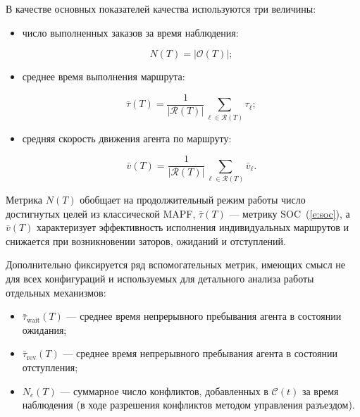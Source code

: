 В качестве основных показателей качества используются три величины:

\begin{itemize}
    \item число выполненных заказов за время наблюдения:

        \begin{equation}
            N(T) = |\mathcal{O}(T)|;
        \label{e:metric-orders}
        \end{equation}

    \item среднее время выполнения маршрута:

        \begin{equation}
            \bar\tau(T) = \frac{1}{|\mathcal{R}(T)|} \sum_{\ell \in \mathcal{R}(T)} \tau_\ell;
        \label{e:metric-order-time}
        \end{equation}

    \item средняя скорость движения агента по маршруту:

        \begin{equation}
            \bar v(T) = \frac{1}{|\mathcal{R}(T)|} \sum_{\ell \in \mathcal{R}(T)} \bar v_\ell.
        \label{e:metric-speed}
        \end{equation}
\end{itemize}

Метрика $N(T)$ обобщает на продолжительный режим работы число достигнутых целей из классической MAPF, 
$\bar\tau(T)$ --- метрику $\mathrm{SOC}$~(\ref{e:soc}), а $\bar v(T)$ характеризует эффективность 
исполнения индивидуальных маршрутов и снижается при возникновении заторов, ожиданий и отступлений.

Дополнительно фиксируется ряд вспомогательных метрик, имеющих смысл не для всех
конфигураций и используемых для детального анализа работы отдельных механизмов:

\begin{itemize}
    \item $\bar\tau_{\mathrm{wait}}(T)$ --- среднее время непрерывного пребывания
        агента в состоянии ожидания;

    \item $\bar\tau_{\mathrm{rev}}(T)$ --- среднее время непрерывного пребывания агента в
        состоянии отступления;

    \item $N_c(T)$ --- суммарное число конфликтов, добавленных в $\mathcal{C}(t)$ за
        время наблюдения (в ходе разрешения конфликтов методом управления разъездом).
\end{itemize}

